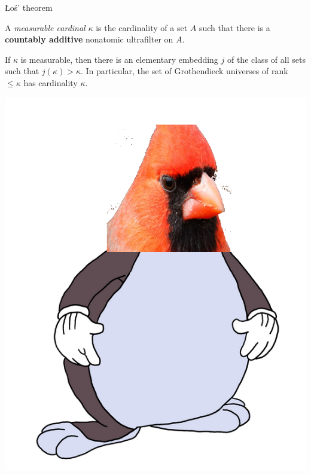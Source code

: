 \documentclass[10pt]{beamer}
\begin{document}
\begin{frame}{Łoś' theorem}

\begin{definition}
    A \emph{measurable cardinal} $\kappa$ is the cardinality of a set $A$ such that there is a \textbf{countably additive} nonatomic ultrafilter on $A$.
\end{definition}

\pause

\begin{theorem}
    If $\kappa$ is measurable, then there is an elementary embedding $j$ of the class of all sets such that $j(\kappa) > \kappa$.
    In particular, the set of Grothendieck universes of rank $\leq \kappa$ has cardinality $\kappa$.
\end{theorem}

\pause

\begin{center}
\includegraphics[scale=0.18]{chungus_cardinal}
\end{center}
\end{frame}
\end{document}
